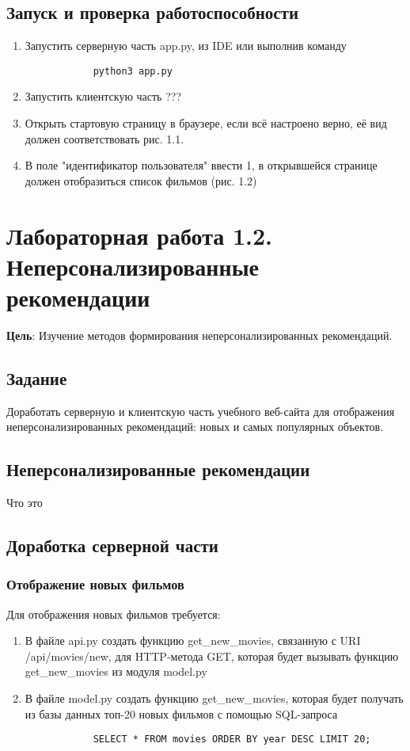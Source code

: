 \documentclass[a4paper,12pt]{report} %
\begin{document}
    \section{Запуск и проверка работоспособности}
    \begin{enumerate}
    	\item Запустить серверную часть app.py, из IDE или выполнив команду 
    	\begin{verbatim}
    		python3 app.py
    	\end{verbatim} 
        \item Запустить клиентскую часть ???
        \item Открыть стартовую страницу в браузере, если всё настроено верно, её вид должен соответствовать рис. 1.1.
        \item В поле "идентификатор пользователя" ввести 1, в открывшейся странице должен отобразиться список фильмов (рис. 1.2)
        
    \end{enumerate}

    \chapter {Лабораторная работа 1.2. Неперсонализированные рекомендации}
    \textbf{Цель}: Изучение методов формирования неперсонализированных рекомендаций.
    
    \section{Задание}
    Доработать серверную и клиентскую часть учебного веб-сайта для отображения неперсонализированных рекомендаций: новых и самых популярных объектов.
    
    \section{Неперсонализированные рекомендации}
    Что это
    
    \section{Доработка серверной части}
    \subsection{Отображение новых фильмов}
    Для отображения новых фильмов требуется:
    \begin{enumerate}
    	\item В файле api.py создать функцию get\_new\_movies,  связанную с URI /api/movies/new, для HTTP-метода GET, которая будет вызывать функцию get\_new\_movies из модуля model.py
    	\item В файле model.py создать функцию get\_new\_movies, которая будет получать из базы данных топ-20 новых фильмов с помощью SQL-запроса
    	\begin{verbatim}
    	    SELECT * FROM movies ORDER BY year DESC LIMIT 20;
    	\end{verbatim}
    \end{enumerate}
\end{document}
